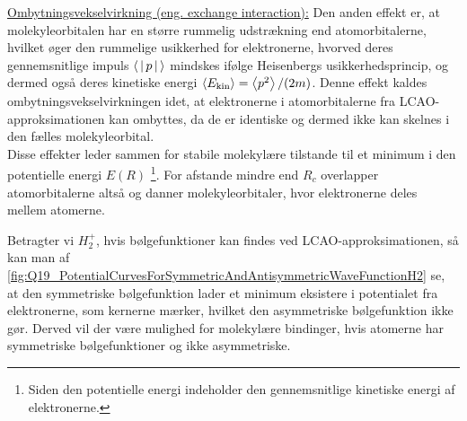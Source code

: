 \underline{Ombytningsvekselvirkning (eng. exchange interaction):} Den anden effekt er, at molekyleorbitalen har en større rummelig udstrækning end atomorbitalerne, hvilket øger den rummelige usikkerhed for elektronerne, hvorved deres gennemsnitlige impuls $\Braket{|p|}$ mindskes ifølge Heisenbergs usikkerhedsprincip, og dermed også deres kinetiske energi $\Braket{E_\text{kin}} = \Braket{p^2}/(2m)$. Denne effekt kaldes ombytningsvekselvirkningen idet, at elektronerne i atomorbitalerne fra LCAO-approksimationen kan ombyttes, da de er identiske og dermed ikke kan skelnes i den fælles molekyleorbital.\\

Disse effekter leder sammen for stabile molekylære tilstande til et minimum i den potentielle energi $E(R)$ \footnote{Siden den potentielle energi indeholder den gennemsnitlige kinetiske energi af elektronerne.}. For afstande mindre end $R_c$ overlapper atomorbitalerne altså og danner molekyleorbitaler, hvor elektronerne deles mellem atomerne.

Betragter vi $H_2^+$, hvis bølgefunktioner kan findes ved LCAO-approksimationen, så kan man af \cref{fig:Q19_PotentialCurvesForSymmetricAndAntisymmetricWaveFunctionH2} se, at den symmetriske bølgefunktion lader et minimum eksistere i potentialet fra elektronerne, som kernerne mærker, hvilket den asymmetriske bølgefunktion ikke gør. Derved vil der være mulighed for molekylære bindinger, hvis atomerne har symmetriske bølgefunktioner og ikke asymmetriske.


